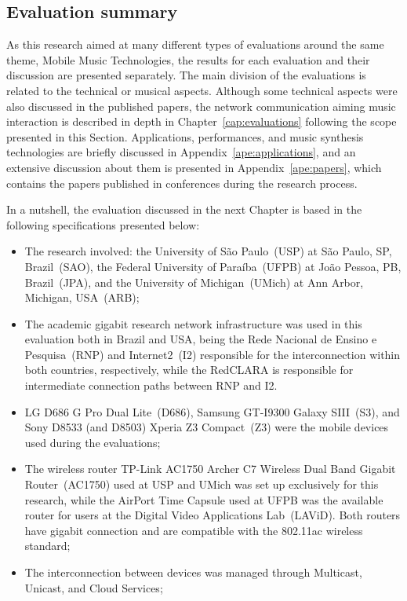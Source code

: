 \subsection*{Evaluation summary}

As this research aimed at many different types of evaluations around the same theme, Mobile Music Technologies, the results for each evaluation and their discussion are presented separately.
The main division of the evaluations is related to the technical or musical aspects.
Although some technical aspects were also discussed in the published papers, the network communication aiming music interaction is described in depth in Chapter~\ref{cap:evaluations} following the scope presented in this Section.
Applications, performances, and music synthesis technologies are briefly discussed in Appendix~\ref{ape:applications}, and an extensive discussion about them is presented in Appendix~\ref{ape:papers}, which contains the papers published in conferences during the research process.

In a nutshell, the evaluation discussed in the next Chapter is based in the following specifications presented below:

\begin{itemize}
	\item The research involved: the University of São Paulo~(USP) at São Paulo, SP, Brazil~(SAO), the Federal University of Paraíba~(UFPB) at João Pessoa, PB, Brazil~(JPA), and the University of Michigan~(UMich) at Ann Arbor, Michigan, USA~(ARB);
	\item The academic gigabit research network infrastructure was used in this evaluation both in Brazil and USA, being the Rede Nacional de Ensino e Pesquisa~(RNP) and Internet2~(I2) responsible for the interconnection within both countries, respectively, while the RedCLARA is responsible for intermediate connection paths between RNP and I2.
	\item LG D686 G Pro Dual Lite~(D686), Samsung GT-I9300 Galaxy SIII~(S3), and Sony D8533 (and D8503) Xperia Z3 Compact~(Z3) were the mobile devices used during the evaluations;
	\item The wireless router TP-Link AC1750 Archer C7 Wireless Dual Band Gigabit Router~(AC1750) used at USP and UMich was set up exclusively for this research, while the AirPort Time Capsule used at UFPB was the available router for users at the Digital Video Applications Lab~(LAViD). Both routers have gigabit connection and are compatible with the 802.11ac wireless standard;
	\item The interconnection between devices was managed through Multicast, Unicast, and Cloud Services;
\end{itemize}


